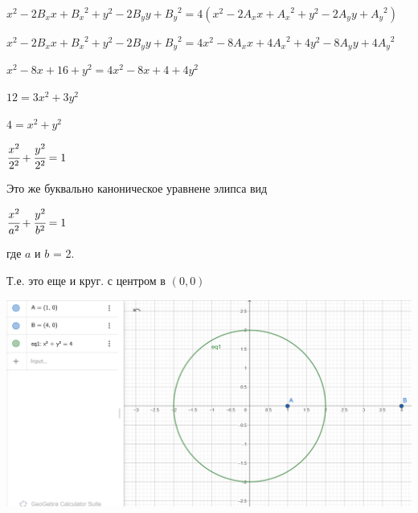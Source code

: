 $x^2 - 2B_xx + {B_x}^2 + y^2 - 2B_yy + {B_y}^2 = 4 (x^2 - 2A_xx + {A_x}^2 + y^2 - 2A_yy + {A_y}^2)$

$x^2 - 2B_xx + {B_x}^2 + y^2 - 2B_yy + {B_y}^2 = 4x^2 - 8A_xx + 4{A_x}^2 + 4y^2 - 8A_yy + 4{A_y}^2$

$x^2 - 8x + 16 + y^2 = 4x^2 - 8x + 4 + 4y^2$

$12 = 3x^2 + 3y^2$

$4 = x^2 + y^2$

$\cfrac{x^2}{2^2} + \cfrac{y^2}{2^2} = 1$

Это же буквально каноническое уравнене элипса вид

$\cfrac{x^2}{a^2} + \cfrac{y^2}{b^2} = 1$

где $a$ и $b$ = 2.

Т.е. это еще и круг. с центром в $(0, 0)$

\includegraphics[width=0.9\linewidth]{images/3_ball.png}

\clearpage
